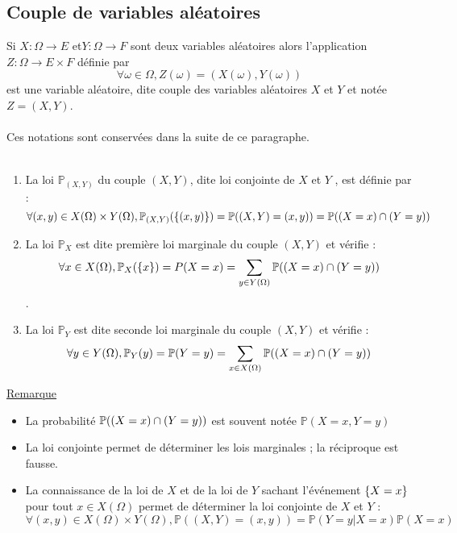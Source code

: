 \subsection{Couple de variables aléatoires}
\begin{defi}
    Si \(X : \Omega \to E\) et\( Y : \Omega \to F\) sont deux variables aléatoires alors l’application \(Z : \Omega \to E \times F\) définie par
    \[\forall \omega \in  \Omega, Z(\omega) = (X(\omega), Y (\omega))\]
    est une variable aléatoire, dite couple des variables aléatoires \(X\) et \(Y\) et notée \(Z = (X, Y )\).\\~\\
    Ces notations sont conservées dans la suite de ce paragraphe.\\~\\
\end{defi}
\begin{defprop}
    \begin{enumerate}
        \item La loi \(\mathbb{P}_{(X,Y )}\) du couple \((X, Y )\), dite loi conjointe de \(X\) et \(Y\) , est définie par :
            \[\forall (x, y) \in  X(\Omega) \times Y (\Omega), \mathbb{P}_{(X,Y )} (\left\lbrace(x, y)\right\rbrace) = \mathbb{P} ((X, Y ) = (x, y)) = \mathbb{P} ((X = x) \cap (Y = y))\]
        \item La loi \(\mathbb{P}_{X}\) est dite première loi marginale du couple \((X, Y )\) et vérifie :
            \[\forall x \in  X(\Omega), \mathbb{P}_{X} (\left\lbrace x\right\rbrace) = P(X = x) = \sum_{y\in Y (\Omega)} \mathbb{P} ((X = x) \cap (Y = y))\] .
        \item La loi \(\mathbb{P}_Y\) est dite seconde loi marginale du couple \((X, Y )\) et vérifie :
            \[\forall y \in  Y (\Omega), \mathbb{P}_Y ({y}) = \mathbb{P}(Y = y) = \sum_{x\in X(\Omega)} \mathbb{P} ((X = x) \cap (Y = y)) \]
    \end{enumerate}
    \underline{Remarque}\\
    \begin{itemize}
        \item La probabilité \(\mathbb{P}((X = x) \cap (Y = y))\) est souvent notée \(\mathbb{P}(X = x, Y = y)\)
        \item La loi conjointe permet de déterminer les lois marginales ; la réciproque est fausse.
        \item La connaissance de la loi de \(X\) et de la loi de \(Y\) sachant l’événement \(\left\lbrace X = x\right\rbrace\) pour tout \(x \in  X(\Omega)\) permet de déterminer la loi conjointe de \(X\) et \(Y\) :
            \[\forall (x, y) \in  X(\Omega) \times Y (\Omega), \mathbb{P} ((X, Y ) = (x, y)) = \mathbb{P}(Y = y | X = x)\mathbb{P}(X = x)\]
    \end{itemize}
\end{defprop}

